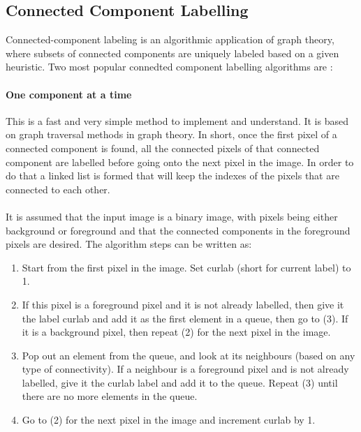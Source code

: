 \documentclass{article}
\begin{document}
	\subsection{Connected Component Labelling}
	Connected-component labeling is an algorithmic application of graph theory, where subsets of connected components are uniquely labeled based on a given heuristic. Two most popular connedted component labelling algorithms are : 

	\paragraph{One component at a time}
	This is a fast and very simple method to implement and understand. It is based on graph traversal methods in graph theory. In short, once the first pixel of a connected component is found, all the connected pixels of that connected component are labelled before going onto the next pixel in the image. In order to do that a linked list is formed that will keep the indexes of the pixels that are connected to each other.

	\paragraph{}
	It is assumed that the input image is a binary image, with pixels being either background or foreground and that the connected components in the foreground pixels are desired. The algorithm steps can be written as:

	\begin{enumerate}
		\item Start from the first pixel in the image. Set curlab (short for 
		current label) to 1.
		\item If this pixel is a foreground pixel and it is not already labelled, then give it the label curlab and add it as the first element in a queue, then go to (3). If it is a background pixel, then repeat (2) for the next pixel in the image.
		\item Pop out an element from the queue, and look at its neighbours (based on any type of connectivity). If a neighbour is a foreground pixel and is not already labelled, give it the curlab label and add it to the queue. Repeat (3) until there are no more elements in the queue.
		\item Go to (2) for the next pixel in the image and increment curlab by 1.

	\end{enumerate}
\end{document}
